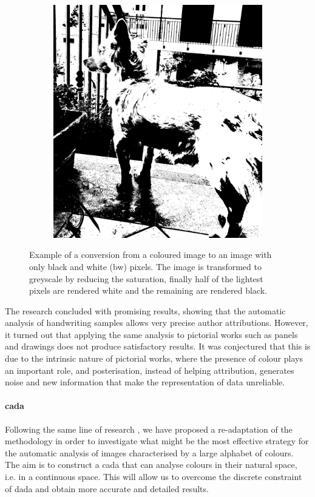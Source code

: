 \begin{figure}[ht]
\begin{subfigure}{0.4\linewidth}
		\includegraphics[width=\linewidth]{Figures/example_bw.jpeg}
	\end{subfigure}
	\caption[Example of conversion from RGB to BW]{Example of a conversion from a coloured image to an image with only black and white (bw) pixels. The image is transformed to greyscale by reducing the saturation, finally half of the lightest pixels are rendered white and the remaining are rendered black.}
	\label{fig:example_bw}
\end{figure}

\noindent The research concluded with promising results, showing that the automatic analysis of handwriting samples allows very precise author attributions. However, it turned out that applying the same analysis to pictorial works such as panels and drawings does not produce satisfactory results. It was conjectured that this is due to the intrinsic nature of pictorial works, where the presence of colour plays an important role, and posterisation, instead of helping attribution, generates noise and new information that make the representation of data unreliable.

\paragraph{\gls{cada}}
Following the same line of research \cite[my bachelor thesis]{thesis}, we have proposed a re-adaptation of the methodology in order to investigate what might be the most effective strategy for the automatic analysis of images characterised by a large alphabet of colours. The aim is to construct a \gls{cada} that can analyse colours in their natural space, i.e. in a continuous space. This will allow us to overcome the discrete constraint of \gls{dada} and obtain more accurate and detailed results.

